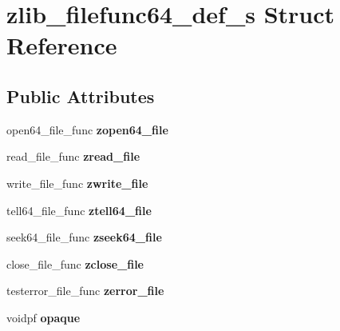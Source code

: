 \hypertarget{structzlib__filefunc64__def__s}{\section{zlib\-\_\-filefunc64\-\_\-def\-\_\-s Struct Reference}
\label{structzlib__filefunc64__def__s}
}
\subsection*{Public Attributes}
\begin{DoxyCompactItemize}
\item 
\hypertarget{structzlib__filefunc64__def__s_a53df1c67f9b44a61e607b9cfb9c409c0}{open64\-\_\-file\-\_\-func {\bfseries zopen64\-\_\-file}}\label{structzlib__filefunc64__def__s_a53df1c67f9b44a61e607b9cfb9c409c0}

\item 
\hypertarget{structzlib__filefunc64__def__s_a5fd1cd36c741000649328d0db54523c5}{read\-\_\-file\-\_\-func {\bfseries zread\-\_\-file}}\label{structzlib__filefunc64__def__s_a5fd1cd36c741000649328d0db54523c5}

\item 
\hypertarget{structzlib__filefunc64__def__s_a04f5366c9e7e48343357bb88b46998f9}{write\-\_\-file\-\_\-func {\bfseries zwrite\-\_\-file}}\label{structzlib__filefunc64__def__s_a04f5366c9e7e48343357bb88b46998f9}

\item 
\hypertarget{structzlib__filefunc64__def__s_a88b8bd0d697c49e384915fcab765b5b3}{tell64\-\_\-file\-\_\-func {\bfseries ztell64\-\_\-file}}\label{structzlib__filefunc64__def__s_a88b8bd0d697c49e384915fcab765b5b3}

\item 
\hypertarget{structzlib__filefunc64__def__s_ab03b3242d363b748ea6e60b7b9e5e6d1}{seek64\-\_\-file\-\_\-func {\bfseries zseek64\-\_\-file}}\label{structzlib__filefunc64__def__s_ab03b3242d363b748ea6e60b7b9e5e6d1}

\item 
\hypertarget{structzlib__filefunc64__def__s_aaf7d9825e2afc16c93cec9956c4f1a10}{close\-\_\-file\-\_\-func {\bfseries zclose\-\_\-file}}\label{structzlib__filefunc64__def__s_aaf7d9825e2afc16c93cec9956c4f1a10}

\item 
\hypertarget{structzlib__filefunc64__def__s_abdac5e81672673ef1f4242d6fdc49d2d}{testerror\-\_\-file\-\_\-func {\bfseries zerror\-\_\-file}}\label{structzlib__filefunc64__def__s_abdac5e81672673ef1f4242d6fdc49d2d}

\item 
\hypertarget{structzlib__filefunc64__def__s_a5f6d2267b03488a9edc3fdd9a2da0c2f}{voidpf {\bfseries opaque}}\label{structzlib__filefunc64__def__s_a5f6d2267b03488a9edc3fdd9a2da0c2f}

\end{DoxyCompactItemize}


